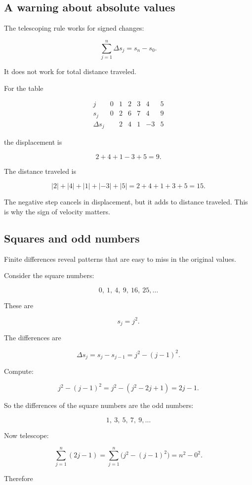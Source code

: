 \subsection{A warning about absolute values}

The telescoping rule works for signed changes:

\[
\sum_{j=1}^{n}\Delta s_j=s_n-s_0.
\]

It does not work for total distance traveled.

For the table

\[
\begin{array}{c|rrrrrr}
j & 0 & 1 & 2 & 3 & 4 & 5 \\ \hline
s_j & 0 & 2 & 6 & 7 & 4 & 9 \\
\Delta s_j & & 2 & 4 & 1 & -3 & 5
\end{array}
\]

the displacement is

\[
2+4+1-3+5=9.
\]

The distance traveled is

\[
|2|+|4|+|1|+|-3|+|5|
=
2+4+1+3+5
=
15.
\]

The negative step cancels in displacement, but it adds to distance traveled. This is why the sign of velocity matters.

\subsection{Squares and odd numbers}

Finite differences reveal patterns that are easy to miss in the original values.

Consider the square numbers:

\[
0,\ 1,\ 4,\ 9,\ 16,\ 25,\ldots
\]

These are

\[
s_j=j^2.
\]

The differences are

\[
\Delta s_j=s_j-s_{j-1}=j^2-(j-1)^2.
\]

Compute:

\[
j^2-(j-1)^2
=
j^2-(j^2-2j+1)
=
2j-1.
\]

So the differences of the square numbers are the odd numbers:

\[
1,\ 3,\ 5,\ 7,\ 9,\ldots
\]

Now telescope:

\[
\sum_{j=1}^{n}(2j-1)
=
\sum_{j=1}^{n}\bigl(j^2-(j-1)^2\bigr)
=
n^2-0^2.
\]

Therefore

